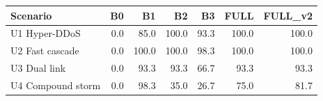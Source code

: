 \begin{tabular}{lrrrrrr}
\toprule
Scenario & B0 & B1 & B2 & B3 & FULL & FULL\_v2 \\
\midrule
U1 Hyper-DDoS & 0.0 & 85.0 & 100.0 & 93.3 & 100.0 & 100.0 \\
U2 Fast cascade & 0.0 & 100.0 & 100.0 & 98.3 & 100.0 & 100.0 \\
U3 Dual link & 0.0 & 93.3 & 93.3 & 66.7 & 93.3 & 93.3 \\
U4 Compound storm & 0.0 & 98.3 & 35.0 & 26.7 & 75.0 & 81.7 \\
\bottomrule
\end{tabular}
